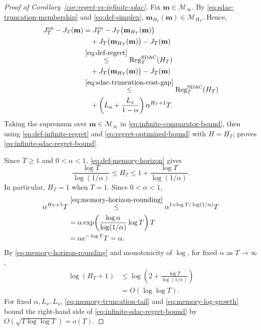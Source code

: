 \documentclass[journal]{IEEEtran}
\theoremstyle{remark}
\newcommand{\RegSDAC}[1]{\operatorname{Reg}_{#1}^{\mathrm{SDAC}}}
\begin{document}
\begin{proof}[Proof of Corollary~\ref{cor:regret-vs-infinite-sdac}]
Fix $\mathbf{m}\in\mathcal{M}_\infty$. By
\eqref{eq:sdac-truncation-membership} and \eqref{eq:def-simplex},
$\mathbf{m}_{H_T}(\mathbf{m})\in\mathcal{M}_{H_T}$.
Hence,
\begin{equation}
\label{eq:infinite-comparator-bound}
\begin{aligned}
J_T^{\mathrm{on}}-J_T(\mathbf{m})
&=J_T^{\mathrm{on}}-J_T\bigl(\mathbf{m}_{H_T}(\mathbf{m})\bigr)\\
&\quad+J_T\bigl(\mathbf{m}_{H_T}(\mathbf{m})\bigr)-J_T(\mathbf{m})\\
&\overset{\eqref{eq:def-regret}}{\le}\RegSDAC{T}(H_T)\\
&\quad+J_T\bigl(\mathbf{m}_{H_T}(\mathbf{m})\bigr)-J_T(\mathbf{m})\\
&\overset{\eqref{eq:sdac-truncation-cost-gap}}{\le}\RegSDAC{T}(H_T)\\
&\quad+\left(L_u+\frac{L_x}{1-\alpha}\right)\alpha^{H_T+1}T.
\end{aligned}
\end{equation}
Taking the supremum over $\mathbf{m}\in\mathcal{M}_\infty$ in
\eqref{eq:infinite-comparator-bound}, then using
\eqref{eq:def-infinite-regret} and \eqref{eq:regret-optimized-bound} with
$H=H_T$, proves
\eqref{eq:infinite-sdac-regret-bound}.

Since $T\ge1$ and $0<\alpha<1$, \eqref{eq:def-memory-horizon} gives
\begin{equation}
\label{eq:memory-horizon-rounding}
\frac{\log T}{\log(1/\alpha)}
\le H_T
\le 1+\frac{\log T}{\log(1/\alpha)}.
\end{equation}
In particular, $H_T=1$ when $T=1$. Since $0<\alpha<1$,
\begin{equation}
\label{eq:memory-truncation-tail}
\begin{aligned}
\alpha^{H_T+1}T
&\overset{\eqref{eq:memory-horizon-rounding}}{\le}
\alpha^{1+\log T/\log(1/\alpha)}T\\
&=\alpha\exp\!\left(
\frac{\log\alpha}{\log(1/\alpha)}\log T\right)T \\
&=\alpha e^{-\log T}T=\alpha.
\end{aligned}
\end{equation}
By \eqref{eq:memory-horizon-rounding} and monotonicity of $\log$, for fixed
$\alpha$ as $T\to\infty$,
\begin{equation}
\label{eq:memory-log-growth}
\begin{aligned}
\log(H_T+1)
&\le\log\!\left(2+\frac{\log T}{\log(1/\alpha)}\right)\\
&=O(\log\log T).
\end{aligned}
\end{equation}
For fixed $\alpha,L_x,L_u$, \eqref{eq:memory-truncation-tail} and
\eqref{eq:memory-log-growth} bound the right-hand side of
\eqref{eq:infinite-sdac-regret-bound} by
$O\!\left(\sqrt{T\log\log T}\right)=o(T)$.


\end{proof}
\end{document}
